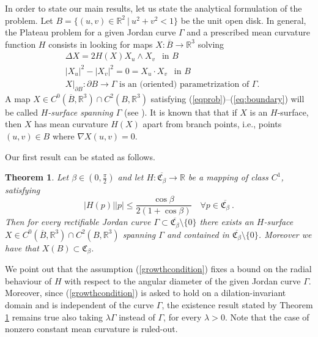 \documentclass[a4paper,reqno,10pt,oneside]{amsart}
\numberwithin{equation}{section}
\newtheorem{theorem}{Theorem}[section]
\begin{document}
In order to state our main results, let us state the analytical formulation of the problem. Let $B=\{(u,v)\in{\mathbb R}^{2}~|~u^{2}+v^{2}<1\}$ be the unit open disk. In general, the Plateau problem for a given Jordan curve $\Gamma$ and a prescribed mean curvature function $H$ consists in looking 
for maps $X\colon\overline{B}\to{\mathbb R}^{3}$ solving
\begin{align}
\label{eqprob}
&\Delta X = 2 H(X) X_u\wedge X_v~~\text{ in $B$}\\
\label{conf}
&|X_u|^2-|X_v|^2=0=X_u \cdot X_v~~\text{ in $B$}\\
\label{eq:boundary}
&X|_{\partial B}\colon\partial B\to\Gamma\text{ is an (oriented) parametrization of }\Gamma.
\end{align}
A map $X \in C^0(\overline{B},{\mathbb R}^3)\cap C^2(B,{\mathbb R}^3)$ satisfying (\ref{eqprob})--(\ref{eq:boundary}) will be called \emph{$H$-surface spanning $\Gamma$} (see \cite{Struwe}). It is known that that if $X$ is an $H$-surface, then $X$ has mean curvature $H(X)$ apart from branch points, i.e., points $(u,v)\in B$ where $\nabla X(u,v)=0$. 

Our first result can be stated as follows.

\begin{theorem}
\label{thm:existence}
Let $\beta\in(0,\frac{\pi}{2})$ and let $H\colon\overline{\mathfrak{C}_{\beta}}\to{\mathbb R}$ be a mapping of class $C^{1}$, satisfying
\begin{equation}
\label{growthcondition}
|H(p)||p|{\leqslant}\frac{\cos\beta}{2(1+\cos\beta)}\quad\forall p\in\overline{\mathfrak{C}_{\beta}}~\!.
\end{equation}
Then for every rectifiable Jordan curve $\Gamma\subset\overline{\mathfrak{C}_{\beta}}\setminus\{0\}$ there exists an $H$-surface $X \in C^0(\overline{B},{\mathbb R}^3) \cap C^2(B,{\mathbb R}^3)$ spanning $\Gamma$ and contained in $\overline{\mathfrak{C}_{\beta}}\setminus\{0\}$. Moreover we have that $X(B) \subset \mathfrak{C}_\beta$.  
\end{theorem}
We point out that the assumption (\ref{growthcondition}) fixes a bound on the radial behaviour of $H$ with respect to the angular diameter of the given Jordan curve $\Gamma$. Moreover, since (\ref{growthcondition}) is asked to hold on a dilation-invariant domain and is independent of the curve $\Gamma$, the existence result stated by Theorem \ref{thm:existence} remains true also taking $\lambda\Gamma$ instead of $\Gamma$, for every $\lambda>0$. Note that the case of nonzero constant mean curvature is ruled-out. 
\end{document}
